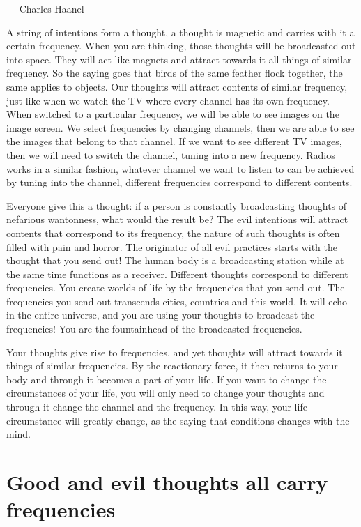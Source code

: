 \documentclass[
]{book}
\begin{document}
--- Charles Haanel

A string of intentions form a thought, a thought is magnetic and carries with it a certain frequency. When you are thinking, those thoughts will be broadcasted out into space. They will act like magnets and attract towards it all things of similar frequency. So the saying goes that birds of the same feather flock together, the same applies to objects. Our thoughts will attract contents of similar frequency, just like when we watch the TV where every channel has its own frequency. When switched to a particular frequency, we will be able to see images on the image screen. We select frequencies by changing channels, then we are able to see the images that belong to that channel. If we want to see different TV images, then we will need to switch the channel, tuning into a new frequency. Radios works in a similar fashion, whatever channel we want to listen to can be achieved by tuning into the channel, different frequencies correspond to different contents.

Everyone give this a thought: if a person is constantly broadcasting thoughts of nefarious wantonness, what would the result be? The evil intentions will attract contents that correspond to its frequency, the nature of such thoughts is often filled with pain and horror. The originator of all evil practices starts with the thought that you send out! The human body is a broadcasting station while at the same time functions as a receiver. Different thoughts correspond to different frequencies. You create worlds of life by the frequencies that you send out. The frequencies you send out transcends cities, countries and this world. It will echo in the entire universe, and you are using your thoughts to broadcast the frequencies! You are the fountainhead of the broadcasted frequencies.

Your thoughts give rise to frequencies, and yet thoughts will attract towards it things of similar frequencies. By the reactionary force, it then returns to your body and through it becomes a part of your life. If you want to change the circumstances of your life, you will only need to change your thoughts and through it change the channel and the frequency. In this way, your life circumstance will greatly change, as the saying that conditions changes with the mind.

\hypertarget{good-and-evil-thoughts-all-carry-frequencies}{%
\section{Good and evil thoughts all carry frequencies}\label{good-and-evil-thoughts-all-carry-frequencies}}
\end{document}
